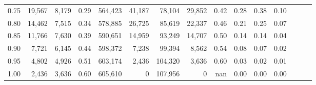 \begin{tabular}{rrrrrrrrrrrrrrr}
0.75 &  19,567 &  8,179 &  0.29 &  564,423 &   41,187 &   78,104 &   29,852 &  0.42 &  0.28 &  0.38 &      0.10 \\
0.80 &  14,462 &  7,515 &  0.34 &  578,885 &   26,725 &   85,619 &   22,337 &  0.46 &  0.21 &  0.25 &      0.07 \\
0.85 &  11,766 &  7,630 &  0.39 &  590,651 &   14,959 &   93,249 &   14,707 &  0.50 &  0.14 &  0.14 &      0.04 \\
0.90 &   7,721 &  6,145 &  0.44 &  598,372 &    7,238 &   99,394 &    8,562 &  0.54 &  0.08 &  0.07 &      0.02 \\
0.95 &   4,802 &  4,926 &  0.51 &  603,174 &    2,436 &  104,320 &    3,636 &  0.60 &  0.03 &  0.02 &      0.01 \\
1.00 &   2,436 &  3,636 &  0.60 &  605,610 &        0 &  107,956 &        0 &   nan &  0.00 &  0.00 &      0.00 \\
\bottomrule
\end{tabular}
